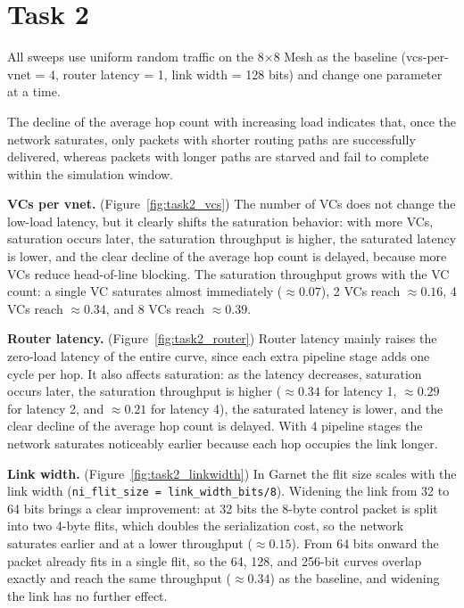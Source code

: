 \documentclass[11pt]{article}
\begin{document}
\section*{Task 2}
All sweeps use uniform random traffic on the 8$\times$8 Mesh as the baseline
(vcs-per-vnet = 4, router latency = 1, link width = 128 bits) and change one
parameter at a time.

The decline of the average hop count with increasing load indicates that, once
the network saturates, only packets with shorter routing paths are successfully
delivered, whereas packets with longer paths are starved and fail to complete
within the simulation window.

\textbf{VCs per vnet.} (Figure~\ref{fig:task2_vcs}) The number of VCs does not change the low-load latency,
but it clearly shifts the saturation behavior: with more VCs, saturation occurs
later, the saturation throughput is higher, the saturated latency is lower, and
the clear decline of the average hop count is delayed, because more VCs reduce
head-of-line blocking. The saturation throughput grows with the VC count: a
single VC saturates almost immediately ($\approx 0.07$), 2 VCs reach
$\approx 0.16$, 4 VCs reach $\approx 0.34$, and 8 VCs reach $\approx 0.39$.

\textbf{Router latency.} (Figure~\ref{fig:task2_router}) Router latency mainly raises the zero-load latency of
the entire curve, since each extra pipeline stage adds one cycle per hop. It also
affects saturation: as the latency decreases, saturation occurs later, the
saturation throughput is higher ($\approx 0.34$ for latency 1, $\approx 0.29$
for latency 2, and $\approx 0.21$ for latency 4), the saturated latency is
lower, and the clear decline of the average hop count is delayed. With 4
pipeline stages the network saturates noticeably earlier because each hop
occupies the link longer.

\textbf{Link width.} (Figure~\ref{fig:task2_linkwidth}) In Garnet the flit size scales with the link width
(\texttt{ni\_flit\_size = link\_width\_bits/8}). Widening the link from 32 to
64 bits brings a clear improvement: at 32 bits the 8-byte control packet is
split into two 4-byte flits, which doubles the serialization cost, so the
network saturates earlier and at a lower throughput ($\approx 0.15$). From 64
bits onward the packet already fits in a single flit, so the 64, 128, and
256-bit curves overlap exactly and reach the same throughput ($\approx 0.34$)
as the baseline, and widening the link has no further effect.
\end{document}

